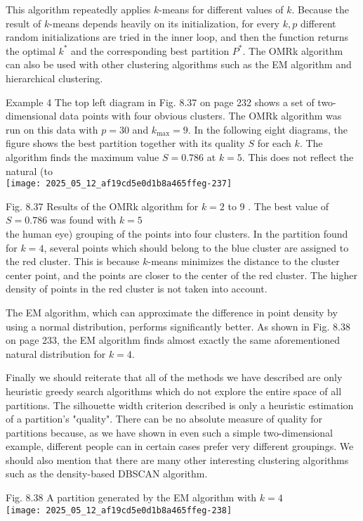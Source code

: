 \documentclass[10pt]{article}
\begin{document}
This algorithm repeatedly applies $k$-means for different values of $k$. Because the result of $k$-means depends heavily on its initialization, for every $k, p$ different random initializations are tried in the inner loop, and then the function returns the optimal $k^{*}$ and the corresponding best partition $P^{*}$. The OMRk algorithm can also be used with other clustering algorithms such as the EM algorithm and hierarchical clustering.

Example 4 The top left diagram in Fig. 8.37 on page 232 shows a set of two-dimensional data points with four obvious clusters. The OMRk algorithm was run on this data with $p=30$ and $k_{\max }=9$. In the following eight diagrams, the figure shows the best partition together with its quality $S$ for each $k$. The algorithm finds the maximum value $S=0.786$ at $k=5$. This does not reflect the natural (to\\
\texttt{[image: 2025\_05\_12\_af19cd5e0d1b8a465ffeg-237]}

Fig. 8.37 Results of the OMRk algorithm for $k=2$ to 9 . The best value of $S=0.786$ was found with $k=5$\\
the human eye) grouping of the points into four clusters. In the partition found for $k=4$, several points which should belong to the blue cluster are assigned to the red cluster. This is because $k$-means minimizes the distance to the cluster center point, and the points are closer to the center of the red cluster. The higher density of points in the red cluster is not taken into account.

The EM algorithm, which can approximate the difference in point density by using a normal distribution, performs significantly better. As shown in Fig. 8.38 on page 233, the EM algorithm finds almost exactly the same aforementioned natural distribution for $k=4$.

Finally we should reiterate that all of the methods we have described are only heuristic greedy search algorithms which do not explore the entire space of all partitions. The silhouette width criterion described is only a heuristic estimation of a partition's "quality". There can be no absolute measure of quality for partitions because, as we have shown in even such a simple two-dimensional example, different people can in certain cases prefer very different groupings. We should also mention that there are many other interesting clustering algorithms such as the density-based DBSCAN algorithm.

Fig. 8.38 A partition generated by the EM algorithm with $k=4$\\
\texttt{[image: 2025\_05\_12\_af19cd5e0d1b8a465ffeg-238]}
\end{document}
